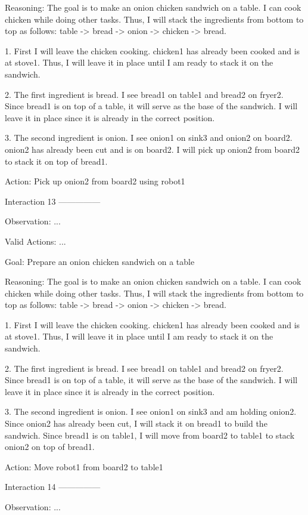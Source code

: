 Reasoning: The goal is to make an onion chicken sandwich on a table. I can cook chicken while doing other tasks. Thus, I
will stack the ingredients from bottom to top as follows: table -> bread -> onion -> chicken -> bread.

1. First I will leave the chicken cooking. chicken1 has already been cooked and is at stove1. Thus, I will leave it in place until I am ready to stack it on the sandwich.

2. The first ingredient is bread. I see bread1 on table1 and bread2 on fryer2. Since bread1 is on top of a table, it will serve as the base of the sandwich. I will leave it in place since it is already in the correct position.

3. The second ingredient is onion. I see onion1 on sink3 and onion2 on board2. onion2 has already been cut and is on board2. I will pick up onion2 from board2 to stack it on top of bread1.

Action: Pick up onion2 from board2 using robot1


Interaction 13
---------------


Observation: ...

Valid Actions: ...

Goal: Prepare an onion chicken sandwich on a table


Reasoning: The goal is to make an onion chicken sandwich on a table. I can cook chicken while doing other tasks. Thus, I
will stack the ingredients from bottom to top as follows: table -> bread -> onion -> chicken -> bread.

1. First I will leave the chicken cooking. chicken1 has already been cooked and is at stove1. Thus, I will leave it in place until I am ready to stack it on the sandwich.

2. The first ingredient is bread. I see bread1 on table1 and bread2 on fryer2. Since bread1 is on top of a table, it will serve as the base of the sandwich. I will leave it in place since it is already in the correct position.

3. The second ingredient is onion. I see onion1 on sink3 and am holding onion2. Since onion2 has already been cut, I will stack it on bread1 to build the sandwich. Since bread1 is on table1, I will move from board2 to table1 to stack onion2 on top of bread1.

Action: Move robot1 from board2 to table1


Interaction 14
---------------


Observation: ...

